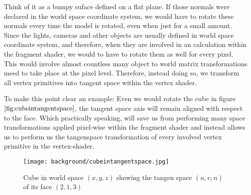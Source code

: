 Think of it as a bumpy suface defined on a flat plane. If those normals were declared in the world space coordinate system, we would have to rotate these normals every time the model is rotated, even when just for a small amount. Since the lights, cameras and other objects are usually defined in world space coordinate system, and therefore, when they are involved in an calculation within the fragment shader, we would to have to rotate them as well for every pixel. This would involve almost countless many object to world matrix transformations meed to take place at the pixel level. Therefore, instead doing so, we transform all vertex primitives into tangent space within the vertex shader. 

To make this point clear an example: Even we would rotate the cube in figure $\ref{fig:cubeintangentspace}$, the tangent space axis will remain aligned with respect to the face. Which practically speaking, will save us from performing many space transformations applied pixel-wise within the fragment shader and instead allows us to perform us the tangenspace transformation of every involved vertex primitive in the vertex-shader.

\begin{figure}[H]
  \centering
  \texttt{[image: background/cubeintangentspace.jpg]}
  \caption{Cube in world space $(x,y,z)$ showing the tangen space $(u,v,n)$ of its face $(2,1,3)$}
  \label{fig:cubeintangentspace}
\end{figure}






